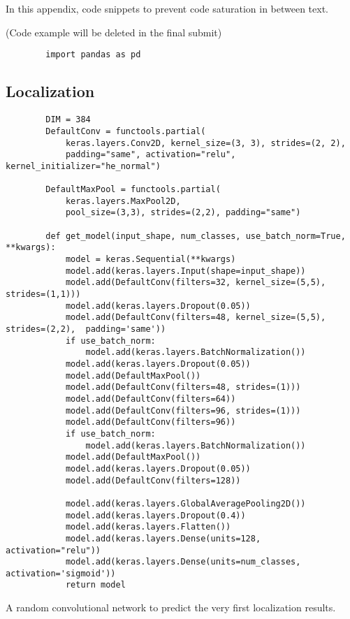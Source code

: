 \chapter{}%
\label{ch:code-snippets}


In this appendix, code snippets to prevent code saturation in between text.

(Code example will be deleted in the final submit)

\begin{listing}
    \begin{verbatim}
        import pandas as pd
    \end{verbatim}
    \caption[]{}
    \label{code:}
\end{listing}


\section{Localization}
\label{sec:code-localization}

\begin{listing}
    \begin{verbatim}
        DIM = 384
        DefaultConv = functools.partial(
            keras.layers.Conv2D, kernel_size=(3, 3), strides=(2, 2),
            padding="same", activation="relu", kernel_initializer="he_normal")

        DefaultMaxPool = functools.partial(
            keras.layers.MaxPool2D,
            pool_size=(3,3), strides=(2,2), padding="same")

        def get_model(input_shape, num_classes, use_batch_norm=True, **kwargs):
            model = keras.Sequential(**kwargs)
            model.add(keras.layers.Input(shape=input_shape))
            model.add(DefaultConv(filters=32, kernel_size=(5,5), strides=(1,1)))
            model.add(keras.layers.Dropout(0.05))
            model.add(DefaultConv(filters=48, kernel_size=(5,5), strides=(2,2),  padding='same'))
            if use_batch_norm:
                model.add(keras.layers.BatchNormalization())
            model.add(keras.layers.Dropout(0.05))
            model.add(DefaultMaxPool())
            model.add(DefaultConv(filters=48, strides=(1)))
            model.add(DefaultConv(filters=64))
            model.add(DefaultConv(filters=96, strides=(1)))
            model.add(DefaultConv(filters=96))
            if use_batch_norm:
                model.add(keras.layers.BatchNormalization())
            model.add(DefaultMaxPool())
            model.add(keras.layers.Dropout(0.05))
            model.add(DefaultConv(filters=128))

            model.add(keras.layers.GlobalAveragePooling2D())
            model.add(keras.layers.Dropout(0.4))
            model.add(keras.layers.Flatten())
            model.add(keras.layers.Dense(units=128, activation="relu"))
            model.add(keras.layers.Dense(units=num_classes, activation='sigmoid'))
            return model
    \end{verbatim}
    \caption[keras random conv]{A random convolutional network to predict the very first localization results.}
    \label{code:keras-random-conv}
\end{listing}

